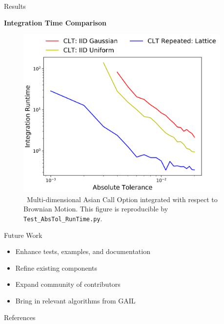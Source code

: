 \documentclass[final]{beamer}
\newcommand{\bfCenter}[1]{\centerline{\textbf{#1}}}
\newlength{\sepwid}
\newlength{\onecolwid}
\begin{document}
\begin{frame}[t]
\begin{columns}[t]
\begin{column}{\sepwid}\end{column}
\begin{column}{\onecolwid}\vspace{-.3in}
\begin{block}{Results}
    \bfCenter{Integration Time Comparison}
    \begin{figure}
        \includegraphics[width=1\textwidth]{Images/AbsTol_Runtime_LinePlot.png}
        \caption{\ Multi-dimensional Asian Call Option integrated with respect to  Brownian Motion. This figure is reproducible by \texttt{Test\_AbsTol\_RunTime.py}.}
    \end{figure}
\end{block}

\vspace{-.5in}
\begin{block}{Future Work}
    \begin{itemize}
        \item Enhance tests, examples, and documentation
        \item Refine existing components
        \item Expand community of contributors
        \item Bring in relevant algorithms from GAIL~\cite{ChoEtal19}
    \end{itemize}
\end{block}

\vspace{-.5in}
\begin{block}{References}


\end{block}
\end{column}
\end{columns}
\end{frame}
\end{document}
